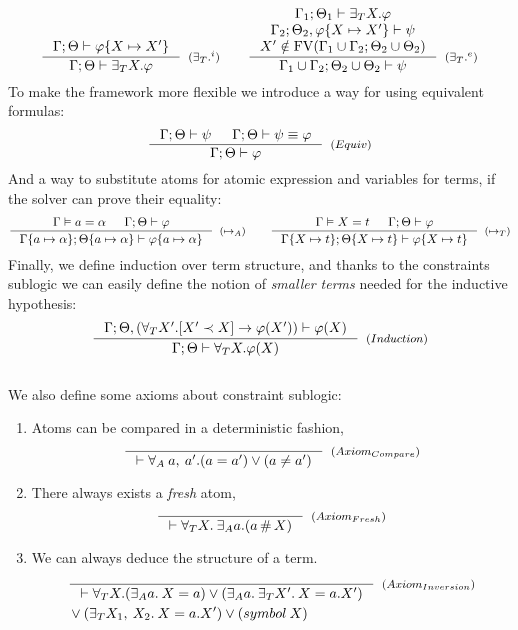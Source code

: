 \documentclass[english, mgr]{iithesis}
\renewcommand{\it}[1]{\textit{#1}}
\begin{document}
$$
  \inference{
    \jgmnt[\cEnv;\Theta]{\formphi \{\termv \mapsto \termv'\}}
    }{
    \jgmnt[\cEnv;\Theta]{\fExistsTerm{\termv}\formphi}
  }[(\ensuremath{{\fExistsTerm{}}^i})]
  \qquad
  \inference{
    \jgmnt[\cEnv_1;\Theta_1]{\fExistsTerm{\termv}\formphi} \\
    \jgmnt[\cEnv_2;\Theta_2,\formphi \{\termv \mapsto \termv'\}]{\psi} \\
    \termv' \notin \fv[\cEnv_1 \cup \cEnv_2;\Theta_2 \cup \Theta_2]
    }{
    \jgmnt[\cEnv_1 \cup \cEnv_2;\Theta_2 \cup \Theta_2]{\psi}
  }[(\ensuremath{{\fExistsTerm{}}^e})]
$$
To make the framework more flexible we introduce a way for using equivalent formulas:
$$
  \inference{
    \jgmnt[\cEnv;\Theta]{\psi} &
    \jgmnt[\cEnv;\Theta]{\psi \equiv \formphi}
    }{
    \jgmnt[\cEnv;\Theta]{\formphi}
  }[(\ensuremath{Equiv})]
$$
And a way to substitute atoms for atomic expression and variables for terms, if the solver can prove their equality:
$$
  \inference{
    \cjgmnt[\cEnv]{\atomv \ceq \atomexp} &
    \jgmnt[\cEnv;\Theta]{\formphi}
    }{
    \jgmnt[\cEnv\{\atomv \mapsto \atomexp\};\Theta\{\atomv \mapsto \atomexp\}]{\formphi\{\atomv \mapsto \atomexp\}}
  }[(\ensuremath{\mapsto_A})]
\qquad
  \inference{
    \cjgmnt[\cEnv]{\termv \ceq \term} &
    \jgmnt[\cEnv;\Theta]{\formphi}
    }{
    \jgmnt[\cEnv\{\termv \mapsto \term\};\Theta\{\termv \mapsto \term\}]{\formphi\{\termv \mapsto \term\}}
  }[(\ensuremath{\mapsto_T})]
$$
Finally, we define induction over term structure,
and thanks to the constraints sublogic we can easily define the notion of
\it{smaller terms} needed for the inductive hypothesis:
$$
  \inference{
    \jgmnt[\cEnv;\Theta, (\fForallTerm{\termv'} \fCImp{\termv' \cshlt \termv} \formphi(\termv'))]{\formphi(\termv)}
    }{
    \jgmnt[\cEnv;\Theta]{\fForallTerm{\termv} \formphi(\termv)}
  }[(\ensuremath{Induction})]
$$
\\
We also define some axioms about constraint sublogic:
\begin{enumerate}
\item Atoms can be compared in a deterministic fashion,
$$
  \inference{
    }{
    \jgmnt[]{\fForallAtom{\:\atomv,\:\atomv'} (\atomv \ceq \atomv') \vee (\atomv \cneq \atomv')}
  }[(\ensuremath{Axiom_{Compare}})]
$$
\item There always exists a \it{fresh} atom,
$$
  \inference{
    }{
    \jgmnt[]{\fForallTerm{\termv} \:\fExistsAtom{\atomv} (\atomv \cfresh \termv)}
  }[(\ensuremath{Axiom_{Fresh}})]
$$
\item We can always deduce the structure of a term.
\begin{eqnarray*}
  & \inference{
    }{
    \jgmnt[]{\fForallTerm{\termv} (\fExistsAtom{\atomv}\: \termv = \atomv) \vee (\fExistsAtom{\atomv}\:\fExistsTerm{\termv'}\: \termv = \tbind{\atomv}{\termv'}) }
  }[(\ensuremath{Axiom_{Inversion}})] \\
  & \ensuremath{\vee (\fExistsTerm{\termv_1,\:\termv_2}\: \termv = \tbind{\atomv}{\termv'}) \vee ({symbol}\: \termv) } \\
\end{eqnarray*}
\end{enumerate}
\end{document}

